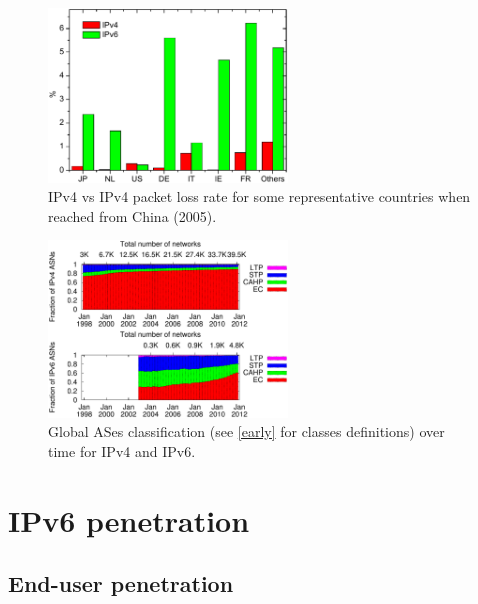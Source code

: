 \documentclass[journal]{IEEEtran}
\begin{document}
\begin{figure}[!t]
    \centering
    \includegraphics[width=2.5in]{packet_loss}
    \caption{IPv4 vs IPv4 packet loss rate for some representative countries
    when reached from China (2005).}
    \label{fig:packet_loss}
\end{figure}

\begin{figure}[!t]
    \centering
    \includegraphics[width=2.5in]{as_types}
    \caption{Global ASes classification (see \ref{early} for classes
    definitions) over time for IPv4 and IPv6.}
    \label{fig:as_types}
\end{figure}

\section{IPv6 penetration}
\label{penetration}

\subsection{End-user penetration}
\label{client_penetration}
\end{document}
